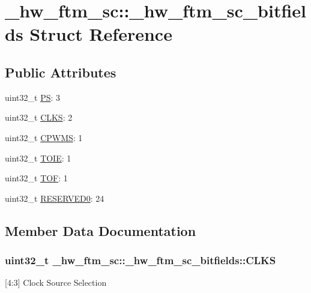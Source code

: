 \hypertarget{struct__hw__ftm__sc_1_1__hw__ftm__sc__bitfields}{}\section{\+\_\+hw\+\_\+ftm\+\_\+sc\+:\+:\+\_\+hw\+\_\+ftm\+\_\+sc\+\_\+bitfields Struct Reference}
\label{struct__hw__ftm__sc_1_1__hw__ftm__sc__bitfields}
\subsection*{Public Attributes}
\begin{DoxyCompactItemize}
\item 
uint32\+\_\+t \hyperlink{struct__hw__ftm__sc_1_1__hw__ftm__sc__bitfields_acfef47b86ab8bb6bd99027c36ba9d0c0}{PS}\+: 3
\item 
uint32\+\_\+t \hyperlink{struct__hw__ftm__sc_1_1__hw__ftm__sc__bitfields_acf641cef35d64fe250ec718705064ca6}{C\+L\+KS}\+: 2
\item 
uint32\+\_\+t \hyperlink{struct__hw__ftm__sc_1_1__hw__ftm__sc__bitfields_a6c7f825ddba6bd13dce2029f8e54e735}{C\+P\+W\+MS}\+: 1
\item 
uint32\+\_\+t \hyperlink{struct__hw__ftm__sc_1_1__hw__ftm__sc__bitfields_af5c5dd72a2248ab4fa4b448321f616fe}{T\+O\+IE}\+: 1
\item 
uint32\+\_\+t \hyperlink{struct__hw__ftm__sc_1_1__hw__ftm__sc__bitfields_a335ef4419cc68559c63157f4a0af5747}{T\+OF}\+: 1
\item 
uint32\+\_\+t \hyperlink{struct__hw__ftm__sc_1_1__hw__ftm__sc__bitfields_a4179061fde0f49187f98798d94a2d819}{R\+E\+S\+E\+R\+V\+E\+D0}\+: 24
\end{DoxyCompactItemize}


\subsection{Member Data Documentation}
\subsubsection[{\texorpdfstring{C\+L\+KS}{CLKS}}]{\setlength{\rightskip}{0pt plus 5cm}uint32\+\_\+t \+\_\+hw\+\_\+ftm\+\_\+sc\+::\+\_\+hw\+\_\+ftm\+\_\+sc\+\_\+bitfields\+::\+C\+L\+KS}\hypertarget{struct__hw__ftm__sc_1_1__hw__ftm__sc__bitfields_acf641cef35d64fe250ec718705064ca6}{}\label{struct__hw__ftm__sc_1_1__hw__ftm__sc__bitfields_acf641cef35d64fe250ec718705064ca6}
\mbox{[}4\+:3\mbox{]} Clock Source Selection 
